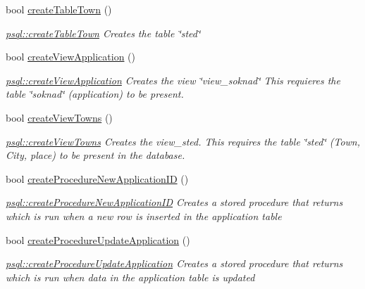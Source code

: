 \begin{DoxyCompactItemize}
bool \mbox{\hyperlink{classpsql_a95d1f522766174bd2c6a7b94f725719c}{create\+Table\+Town}} ()
\begin{DoxyCompactList}\small\item\em \mbox{\hyperlink{classpsql_a95d1f522766174bd2c6a7b94f725719c}{psql\+::create\+Table\+Town}} Creates the table \char`\"{}sted\char`\"{} \end{DoxyCompactList}\item 
bool \mbox{\hyperlink{classpsql_ad6fb8e1e7177c7996f297d477ecceb27}{create\+View\+Application}} ()
\begin{DoxyCompactList}\small\item\em \mbox{\hyperlink{classpsql_ad6fb8e1e7177c7996f297d477ecceb27}{psql\+::create\+View\+Application}} Creates the view \char`\"{}view\+\_\+soknad\char`\"{} This requieres the table \char`\"{}soknad\char`\"{} (application) to be present. \end{DoxyCompactList}\item 
bool \mbox{\hyperlink{classpsql_ac5b1230ac405a600b67b144060b33a0d}{create\+View\+Towns}} ()
\begin{DoxyCompactList}\small\item\em \mbox{\hyperlink{classpsql_ac5b1230ac405a600b67b144060b33a0d}{psql\+::create\+View\+Towns}} Creates the view\+\_\+sted. This requires the table \char`\"{}sted\char`\"{} (Town, City, place) to be present in the database. \end{DoxyCompactList}\item 
bool \mbox{\hyperlink{classpsql_ae9e3ee06f4a5ecd4178662dfa0655fe1}{create\+Procedure\+New\+Application\+ID}} ()
\begin{DoxyCompactList}\small\item\em \mbox{\hyperlink{classpsql_ae9e3ee06f4a5ecd4178662dfa0655fe1}{psql\+::create\+Procedure\+New\+Application\+ID}} Creates a stored procedure that returns which is run when a new row is inserted in the application table \end{DoxyCompactList}\item 
bool \mbox{\hyperlink{classpsql_a28f3e3d6309e3ce57493db284c099946}{create\+Procedure\+Update\+Application}} ()
\begin{DoxyCompactList}\small\item\em \mbox{\hyperlink{classpsql_a28f3e3d6309e3ce57493db284c099946}{psql\+::create\+Procedure\+Update\+Application}} Creates a stored procedure that returns which is run when data in the application table is updated \end{DoxyCompactList}\item 

\end{DoxyCompactItemize}
